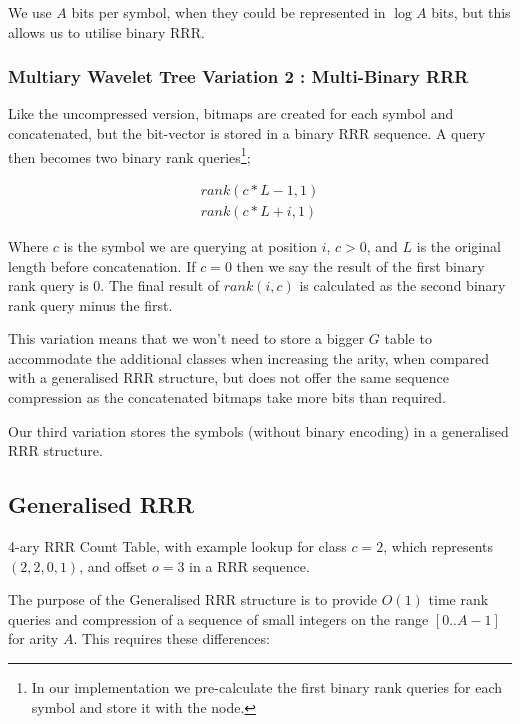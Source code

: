 We use $A$ bits per symbol, when they could be represented in $\log A$ bits, but
this allows us to utilise binary RRR.

\subsubsection{Multiary Wavelet Tree Variation 2 : Multi-Binary RRR}
\label{sec:multi-bin-rrr}
Like the uncompressed version, bitmaps are created for each symbol and 
concatenated, but the bit-vector is stored in a binary RRR sequence. A query 
then becomes two binary rank queries\footnote{In our implementation we 
pre-calculate the first binary rank queries for each symbol and store it with 
the node.};

	\begin{align}
	rank(c * L - 1, 1) \\
	rank(c * L + i, 1)
	\end{align}

Where $c$ is the symbol we are querying at position $i$,
$c > 0$, and $L$ is 
the original length before concatenation. If $c = 0$ then we say the result of 
the first binary rank query is $0$. The final result of $rank(i, c)$ is 
calculated as the second binary rank query minus the first.

This variation means that we won't need to store a bigger $G$ table to 
accommodate the additional classes when increasing the arity, when compared with
a generalised RRR structure, but does not offer the same sequence compression as
the concatenated bitmaps take more bits than required.

Our third variation stores the symbols (without binary encoding) in a 
generalised RRR structure.

\subsection{Generalised RRR}
\label{sec:gen-rrr}

	{4-ary RRR Count Table, with example lookup for class $c = 2$, 
	which represents $(2, 2, 0, 1)$, and offset $o = 3$ in a RRR
	sequence.}
	
The purpose of the Generalised RRR structure is to provide $O(1)$ time rank
queries and compression of a sequence of small integers on the range 
$[0..A-1]$ for arity $A$. This requires these differences:

